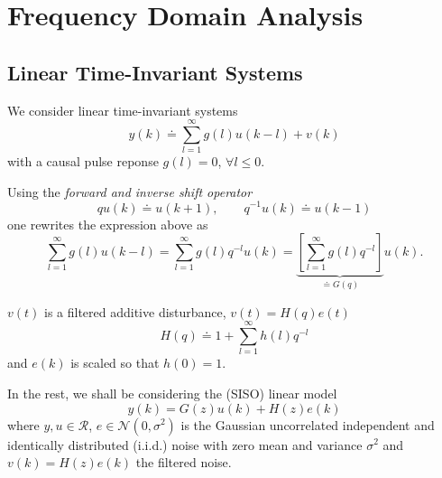 \chapter{Frequency Domain Analysis}
\label{chap:frequency-domain}

\section{Linear Time-Invariant Systems}
\label{sec:LTI}

We consider linear time-invariant systems
\begin{equation}
  \label{eq:linear-model-pulse}
  y(k) \doteq \sum_{l=1}^\infty g(l)u(k-l) + v(k)
\end{equation}
with a causal pulse reponse $g(l)=0$, $\forall l\le 0$.

Using the \emph{forward and inverse shift operator}~\cite[p.~24]{ljung}
\begin{equation*}
  qu(k) \doteq u(k+1), \hspace{2em} q^{-1}u(k) \doteq u(k-1)
\end{equation*}
one rewrites the expression above as
\begin{equation*}
  \sum_{l=1}^\infty g(l)u(k-l) = \sum_{l=1}^\infty g(l)q^{-l}u(k) = \underbrace{\left[\sum_{l=1}^\infty g(l)q^{-l}\right]}_{\doteq G(q)}u(k).
\end{equation*}

$v(t)$ is a filtered additive disturbance, $v(t)=H(q)e(t)$
\begin{equation*}
  H(q) \doteq 1 + \sum_{l=1}^\infty h(l)q^{-l}
\end{equation*}
and $e(k)$ is scaled so that $h(0)=1$.

In the rest, we shall be considering the (SISO) linear model
\begin{equation}
  \label{eq:linear-model-z}
  y(k) = G(z)u(k) + H(z)e(k)
\end{equation}
where $y,u \in \mathcal{R}$, $e \in \mathcal{N}(0,\sigma^2)$ is the Gaussian uncorrelated independent and identically distributed (i.i.d.) noise with zero mean and variance $\sigma^2$ and $v(k) = H(z)e(k)$ the filtered noise.

